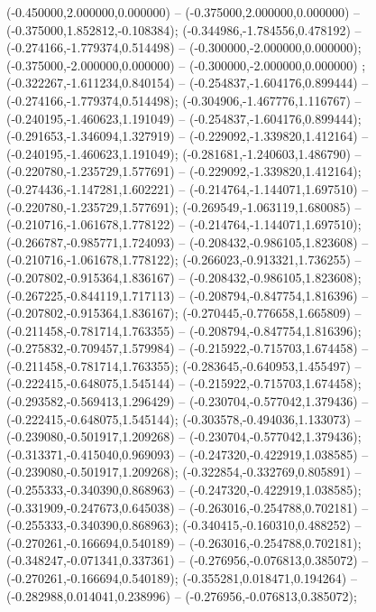  (-0.450000,2.000000,0.000000) -- (-0.375000,2.000000,0.000000) -- (-0.375000,1.852812,-0.108384);
 (-0.344986,-1.784556,0.478192) -- (-0.274166,-1.779374,0.514498) -- (-0.300000,-2.000000,0.000000);
 (-0.375000,-2.000000,0.000000) -- (-0.300000,-2.000000,0.000000) ;
 (-0.322267,-1.611234,0.840154) -- (-0.254837,-1.604176,0.899444) -- (-0.274166,-1.779374,0.514498);
 (-0.304906,-1.467776,1.116767) -- (-0.240195,-1.460623,1.191049) -- (-0.254837,-1.604176,0.899444);
 (-0.291653,-1.346094,1.327919) -- (-0.229092,-1.339820,1.412164) -- (-0.240195,-1.460623,1.191049);
 (-0.281681,-1.240603,1.486790) -- (-0.220780,-1.235729,1.577691) -- (-0.229092,-1.339820,1.412164);
 (-0.274436,-1.147281,1.602221) -- (-0.214764,-1.144071,1.697510) -- (-0.220780,-1.235729,1.577691);
 (-0.269549,-1.063119,1.680085) -- (-0.210716,-1.061678,1.778122) -- (-0.214764,-1.144071,1.697510);
 (-0.266787,-0.985771,1.724093) -- (-0.208432,-0.986105,1.823608) -- (-0.210716,-1.061678,1.778122);
 (-0.266023,-0.913321,1.736255) -- (-0.207802,-0.915364,1.836167) -- (-0.208432,-0.986105,1.823608);
 (-0.267225,-0.844119,1.717113) -- (-0.208794,-0.847754,1.816396) -- (-0.207802,-0.915364,1.836167);
 (-0.270445,-0.776658,1.665809) -- (-0.211458,-0.781714,1.763355) -- (-0.208794,-0.847754,1.816396);
 (-0.275832,-0.709457,1.579984) -- (-0.215922,-0.715703,1.674458) -- (-0.211458,-0.781714,1.763355);
 (-0.283645,-0.640953,1.455497) -- (-0.222415,-0.648075,1.545144) -- (-0.215922,-0.715703,1.674458);
 (-0.293582,-0.569413,1.296429) -- (-0.230704,-0.577042,1.379436) -- (-0.222415,-0.648075,1.545144);
 (-0.303578,-0.494036,1.133073) -- (-0.239080,-0.501917,1.209268) -- (-0.230704,-0.577042,1.379436);
 (-0.313371,-0.415040,0.969093) -- (-0.247320,-0.422919,1.038585) -- (-0.239080,-0.501917,1.209268);
 (-0.322854,-0.332769,0.805891) -- (-0.255333,-0.340390,0.868963) -- (-0.247320,-0.422919,1.038585);
 (-0.331909,-0.247673,0.645038) -- (-0.263016,-0.254788,0.702181) -- (-0.255333,-0.340390,0.868963);
 (-0.340415,-0.160310,0.488252) -- (-0.270261,-0.166694,0.540189) -- (-0.263016,-0.254788,0.702181);
 (-0.348247,-0.071341,0.337361) -- (-0.276956,-0.076813,0.385072) -- (-0.270261,-0.166694,0.540189);
 (-0.355281,0.018471,0.194264) -- (-0.282988,0.014041,0.238996) -- (-0.276956,-0.076813,0.385072);
